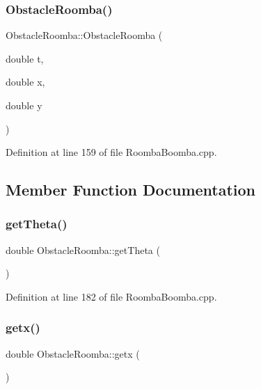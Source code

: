 \subsubsection{\texorpdfstring{ObstacleRoomba()}{ObstacleRoomba()}}
{\footnotesize\ttfamily Obstacle\+Roomba\+::\+Obstacle\+Roomba (\begin{DoxyParamCaption}\item[{double}]{t,  }\item[{double}]{x,  }\item[{double}]{y }\end{DoxyParamCaption})\hspace{0.3cm}{\ttfamily [inline]}}



Definition at line 159 of file Roomba\+Boomba.\+cpp.



\subsection{Member Function Documentation}
\mbox{\label{classObstacleRoomba_a5f3bfef1c9c50bef6efbe4a6c7af829b}} 
\subsubsection{\texorpdfstring{getTheta()}{getTheta()}}
{\footnotesize\ttfamily double Obstacle\+Roomba\+::get\+Theta (\begin{DoxyParamCaption}{ }\end{DoxyParamCaption})\hspace{0.3cm}{\ttfamily [inline]}}



Definition at line 182 of file Roomba\+Boomba.\+cpp.

\mbox{\label{classObstacleRoomba_a7a9a09d525974ac79ed738bfdc769fac}} 
\subsubsection{\texorpdfstring{getx()}{getx()}}
{\footnotesize\ttfamily double Obstacle\+Roomba\+::getx (\begin{DoxyParamCaption}{ }\end{DoxyParamCaption})\hspace{0.3cm}{\ttfamily [inline]}}




